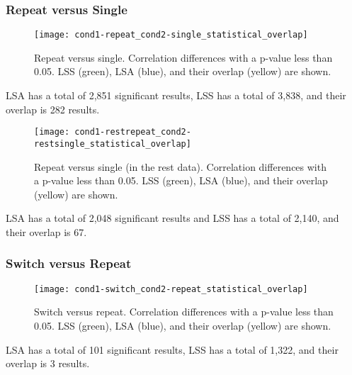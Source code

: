 \documentclass[10pt,letterpaper]{article}
\begin{document}
\subsubsection*{Repeat versus Single}
\begin{figure}[H]
  \centering
  \texttt{[image: cond1-repeat\_cond2-single\_statistical\_overlap]}
  \caption{
    Repeat versus single. Correlation differences with a p-value less than 0.05.
    LSS (green), LSA (blue), and their overlap (yellow) are shown.
  }
  \label{fig:repeatvsingle}
\end{figure}
LSA has a total of 2,851 significant results, LSS has a total of 3,838,
and their overlap is 282 results.

\begin{figure}[H]
  \centering
  \texttt{[image: cond1-restrepeat\_cond2-restsingle\_statistical\_overlap]}
  \caption{
    Repeat versus single (in the rest data). Correlation differences with a p-value less than 0.05.
    LSS (green), LSA (blue), and their overlap (yellow) are shown.
  }
  \label{fig:restrepeatvsingle}
\end{figure}
LSA has a total of 2,048 significant results and LSS has a total of 2,140,
and their overlap is 67.

\subsubsection*{Switch versus Repeat}
\begin{figure}[H]
  \centering
  \texttt{[image: cond1-switch\_cond2-repeat\_statistical\_overlap]}
  \caption{
    Switch versus repeat. Correlation differences with a p-value less than 0.05.
    LSS (green), LSA (blue), and their overlap (yellow) are shown.
  }
  \label{fig:switchvrepeat}
\end{figure}
LSA has a total of 101 significant results, LSS has a total of 1,322,
and their overlap is 3 results.
\end{document}
